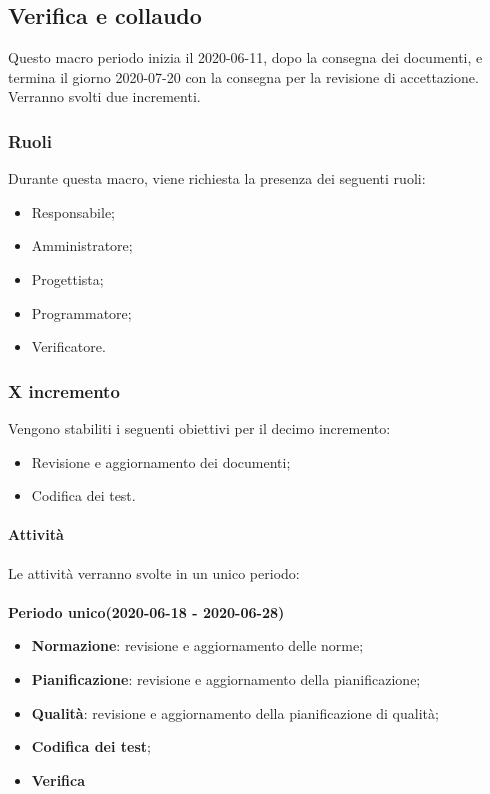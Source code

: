 \documentclass[../piano-di-progetto.tex]{subfiles}
\begin{document}
\subsection{Verifica e collaudo}
Questo macro periodo inizia il 2020-06-11, dopo la consegna dei documenti, e termina il giorno 2020-07-20 con la consegna per la revisione di accettazione. Verranno svolti due incrementi.

\subsubsection{Ruoli}
Durante questa macro, viene richiesta la presenza dei seguenti ruoli:
\begin{itemize}
    \item Responsabile;
    \item Amministratore;
    \item Progettista;
    \item Programmatore;
    \item Verificatore.
\end{itemize}

\subsubsection{X incremento}
 Vengono stabiliti i seguenti obiettivi per il decimo incremento:
 \begin{itemize}
     \item Revisione e aggiornamento dei documenti;
     \item Codifica dei test.
 \end{itemize}

\paragraph{Attività}
Le attività verranno svolte in un unico periodo:
\\
\\
\textbf{Periodo unico(2020-06-18 - 2020-06-28)}
\begin{itemize}
        \item \textbf{Normazione}: revisione e aggiornamento delle norme;
        \item \textbf{Pianificazione}: revisione e aggiornamento della pianificazione;
        \item \textbf{Qualità}: revisione e aggiornamento della pianificazione di qualità;
        \item \textbf{Codifica dei test};
        \item \textbf{Verifica}
\end{itemize}
\end{document}
